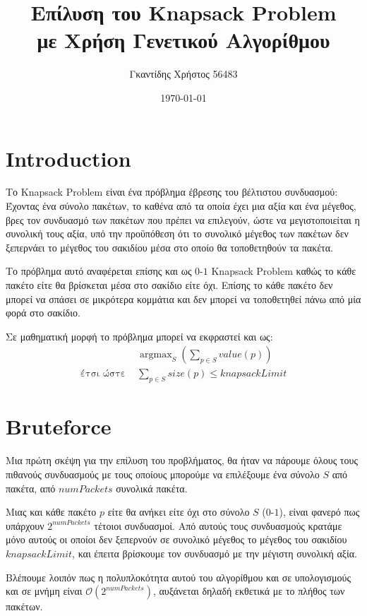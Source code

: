 \documentclass{article}
\title{Επίλυση του Knapsack Problem\\με Χρήση Γενετικού Αλγορίθμου}
\date{\today}
\author{Γκαντίδης Χρήστος 56483}
\DeclareMathOperator*{\argmax}{argmax}
\begin{document}
\maketitle
\newpage

\tableofcontents
\newpage


\section{Introduction}

Το \textenglish{Knapsack Problem} είναι ένα πρόβλημα έβρεσης του βέλτιστου
συνδυασμού: Έχοντας ένα σύνολο πακέτων, το καθένα από τα οποία έχει μια αξία και
ένα μέγεθος, βρες τον συνδυασμό των πακέτων που πρέπει να επιλεγούν, ώστε να
μεγιστοποιείται η συνολική τους αξία, υπό την προϋπόθεση ότι το συνολικό μέγεθος
των πακέτων δεν ξεπερνάει το μέγεθος του σακιδίου μέσα στο οποίο θα τοποθετηθούν
τα πακέτα.

Το πρόβλημα αυτό αναφέρεται επίσης και ως $0$-$1$ \textenglish{Knapsack
Problem} καθώς το κάθε πακέτο είτε θα βρίσκεται μέσα στο σακίδιο είτε όχι.
Επίσης το κάθε πακέτο δεν μπορεί να σπάσει σε μικρότερα κομμάτια και δεν μπορεί
να τοποθετηθεί πάνω από μία φορά στο σακίδιο.

Σε μαθηματική μορφή το πρόβλημα μπορεί να εκφραστεί και ως:
\begin{align*}
    &\argmax_{S}\left(\sum_{p \in S}value(p)\right)\\
    \text{έτσι ώστε } &\sum_{p \in S}size(p) \leq knapsackLimit
\end{align*}

\section{Bruteforce}

Μια πρώτη σκέψη για την επίλυση του προβλήματος, θα ήταν να πάρουμε όλους τους
πιθανούς συνδυασμούς με τους οποίους μπορούμε να επιλέξουμε ένα σύνολο $S$ από
πακέτα, από $numPackets$ συνολικά πακέτα.

Μιας και κάθε πακέτο $p$ είτε θα ανήκει είτε όχι στο σύνολο $S$ ($0$-$1$), είναι
φανερό πως υπάρχουν $2^{numPackets}$ τέτοιοι συνδυασμοί. Από αυτούς τους
συνδυασμούς κρατάμε μόνο αυτούς οι οποίοι δεν ξεπερνούν σε συνολικό μέγεθος το
μέγεθος του σακιδίου $knapsackLimit$, και έπειτα βρίσκουμε τον συνδυασμό με την
μέγιστη συνολική αξία.

Βλέπουμε λοιπόν πως η πολυπλοκότητα αυτού του αλγορίθμου και σε υπολογισμούς και
σε μνήμη είναι $\mathcal{O}\left(2^{numPackets}\right)$, αυξάνεται δηλαδή
εκθετικά με το πλήθος των πακέτων.
\end{document}
